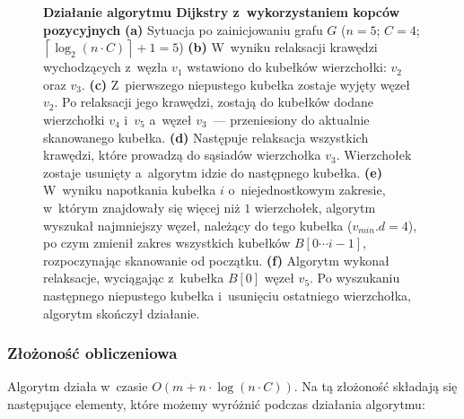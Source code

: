 \begin{figure}[!htbp]
\begin{subfigure}[b]{0.28\textwidth}
		\caption{}
	\end{subfigure}
	\caption{\textbf{Działanie algorytmu Dijkstry z~wykorzystaniem kopców pozycyjnych} \textbf{(a)} Sytuacja po zainicjowaniu grafu $G$ ($n=5$; $C=4$; $ \left \lceil \log_{2} \left( n \cdot C \right) \right \rceil + 1 = 5$) \textbf{(b)} W~wyniku relaksacji krawędzi wychodzących z~węzła $v_{1}$ wstawiono do kubełków wierzchołki: $v_{2}$ oraz $v_{3}$. \textbf{(c)} Z~pierwszego niepustego kubełka zostaje wyjęty węzeł $v_{2}$. Po relaksacji jego krawędzi, zostają do kubełków dodane wierzchołki $v_{4}$ i~$v_{5}$ a~węzeł $v_{3}$~--- przeniesiony do aktualnie skanowanego kubełka. \textbf{(d)} Następuje relaksacja wszystkich krawędzi, które prowadzą do sąsiadów wierzchołka $v_{3}$. Wierzchołek zostaje usunięty a~algorytm idzie do następnego kubełka. \textbf{(e)} W~wyniku napotkania kubełka $i$ o~niejednostkowym zakresie, w~którym znajdowały się więcej niż $1$ wierzchołek, algorytm wyszukał najmniejszy węzeł, należący do tego kubełka ($v_{min}.d = 4$), po czym zmienił zakres wszystkich kubełków $B \left[ 0 \cdots i-1 \right]$, rozpoczynając skanowanie od początku. \textbf{(f)} Algorytm wykonał relaksacje, wyciągając z~kubełka $B \left[ 0 \right]$ węzeł $v_{5}$. Po wyszukaniu następnego niepustego kubełka i~usunięciu ostatniego wierzchołka, algorytm skończył działanie. } \label{fig:exampleRadixHeapNC}
\end{figure}

\subsubsection{Złożoność obliczeniowa}

Algorytm działa w~czasie $ O \left( m + n \cdot \log \left( n \cdot C \right) \right)$. Na tą złożoność składają się następujące elementy, które możemy wyróżnić podczas działania algorytmu:

